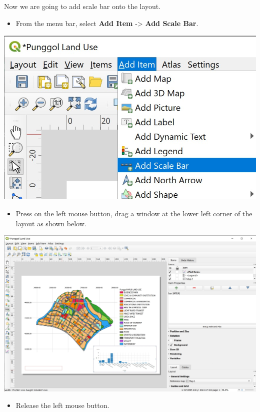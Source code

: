 \documentclass[
  letterpaper,
  DIV=11,
  numbers=noendperiod]{scrreprt}
\providecommand{\tightlist}{%
  \setlength{\itemsep}{0pt}\setlength{\parskip}{0pt}}\usepackage{longtable,booktabs,array}
\begin{document}
Now we are going to add scale bar onto the layout.

\begin{itemize}
\tightlist
\item
  From the menu bar, select \textbf{Add Item} -\textgreater{}
  \textbf{Add Scale Bar}.
\end{itemize}

\includegraphics{./img04/image73.jpg}

\begin{itemize}
\tightlist
\item
  Press on the left mouse button, drag a window at the lower left corner
  of the layout as shown below.
\end{itemize}

\includegraphics{./img04/image74.jpg}

\begin{itemize}
\tightlist
\item
  Release the left mouse button.
\end{itemize}
\end{document}
